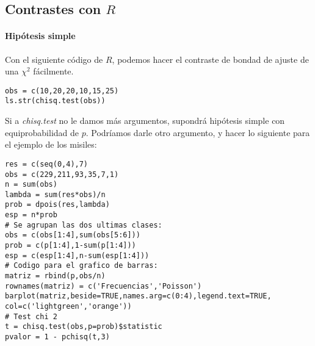 \subsection{Contrastes con $R$}
\paragraph{Hipótesis simple}
Con el siguiente código de $R$, podemos hacer el contraste de bondad de ajuste de una $\chi^2$ fácilmente. 

\begin{lstlisting}[style=mystyle]
obs = c(10,20,20,10,15,25)
ls.str(chisq.test(obs))
\end{lstlisting}

Si a \textit{chisq.test} no le damos más argumentos, supondrá hipótesis simple con equiprobabilidad de $p$. Podríamos darle otro argumento, y hacer lo siguiente para el ejemplo de los misiles:

\begin{lstlisting}[style=mystyle]
res = c(seq(0,4),7)
obs = c(229,211,93,35,7,1)
n = sum(obs)
lambda = sum(res*obs)/n
prob = dpois(res,lambda)
esp = n*prob
# Se agrupan las dos ultimas clases:
obs = c(obs[1:4],sum(obs[5:6]))
prob = c(p[1:4],1-sum(p[1:4]))
esp = c(esp[1:4],n-sum(esp[1:4]))
# Codigo para el grafico de barras:
matriz = rbind(p,obs/n)
rownames(matriz) = c('Frecuencias','Poisson')
barplot(matriz,beside=TRUE,names.arg=c(0:4),legend.text=TRUE,
col=c('lightgreen','orange'))
# Test chi 2
t = chisq.test(obs,p=prob)$statistic
pvalor = 1 - pchisq(t,3)
\end{lstlisting}

